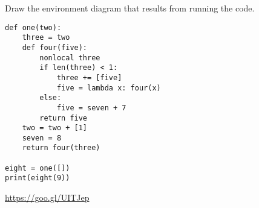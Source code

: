 \begin{blocksection}
\question Draw the environment diagram that results from running the code.

\begin{lstlisting}
def one(two):
    three = two
    def four(five):
        nonlocal three
        if len(three) < 1:
            three += [five]
            five = lambda x: four(x)
        else:
            five = seven + 7
        return five
    two = two + [1]
    seven = 8
    return four(three)

eight = one([])
print(eight(9))
\end{lstlisting}

\begin{solution}[1in]
\url{https://goo.gl/UITJep}
\end{solution}
\end{blocksection}
